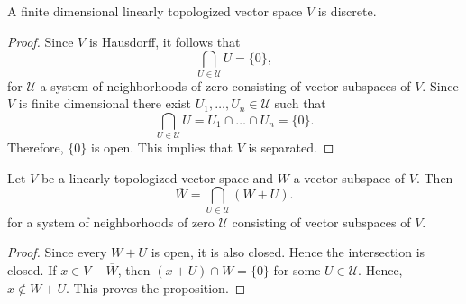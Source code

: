 \begin{proposition}\label{prop:finite_dimensional_linear_topologies}
A finite dimensional linearly topologized vector space $V$ is discrete.
\end{proposition}
\begin{proof}
	Since $V$ is Hausdorff, it follows that
	\[
		\bigcap_{U \in \mathscr{U}}U = \{0\},
	\]
	for $\mathscr{U}$ a system of neighborhoods of zero consisting of vector subspaces of $V$. Since $V$ is finite dimensional there exist $U_{1}, \ldots, U_{n} \in \mathscr{U}$ such that
	\[
		\bigcap_{U \in \mathscr{U}}U = U_{1}\cap \ldots \cap U_{n} = \{0\}.
	\]
	 Therefore, $\{0\}$ is open. This implies that $V$ is separated.
\end{proof}
\begin{proposition}\label{prop:characterization-of-closure}
	Let $V$ be a linearly topologized vector space and $W$ a vector subspace of $V$. Then
	\[
		\overline{W} = \bigcap_{U\in \mathscr{U}} (W + U).
	\]
	for a system of neighborhoods of zero $\mathscr{U}$ consisting of vector subspaces of $V$.
\end{proposition}
\begin{proof}
	Since every $W + U$ is open, it is also closed. Hence the intersection is closed. If $x\in V - \overline{W}$, then $(x + U)\cap W = \{0\}$ for some $U \in \mathscr{U}$. Hence, $x\notin W + U$. This proves the proposition.
\end{proof}
